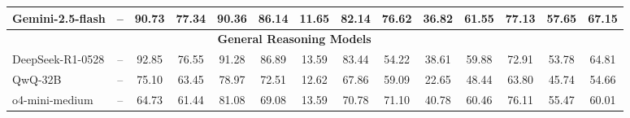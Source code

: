 \begin{adjustbox}{max width=1.0\textwidth}
\begin{tabular}{llcccccccccccc}
Gemini-2.5-flash                                    & \multicolumn{1}{c}{--}                             & 90.73                             & 77.34                             & 90.36                             & 86.14                                & 11.65                            & 82.14                             & 76.62                             & 36.82                             & 61.55                             & 77.13                             & 57.65                                & 67.15                                \\ \midrule
\multicolumn{13}{c}{\textbf{General Reasoning Models}}                                                                                                                                                                                                                                                                                                                                                                                                                                                                    &                                      \\ \midrule
DeepSeek-R1-0528                                    & \multicolumn{1}{c}{--}                             & 92.85                             & 76.55                             & 91.28                             & 86.89                                & 13.59                            & 83.44                             & 54.22                             & 38.61                             & 59.88                             & 72.91                             & 53.78                                & 64.81                                \\
QwQ-32B                                             & \multicolumn{1}{c}{--}                             & 75.10                             & 63.45                             & 78.97                             & 72.51                                & 12.62                            & 67.86                             & 59.09                             & 22.65                             & 48.44                             & 63.80                             & 45.74                                & 54.66                                \\
o4-mini-medium                                      & \multicolumn{1}{c}{--}                             & 64.73                             & 61.44                             & 81.08                             & 69.08                                & 13.59                            & 70.78                             & 71.10                             & 40.78                             & 60.46                             & 76.11                             & 55.47                                & 60.01                                \\

\end{tabular}
\end{adjustbox}
